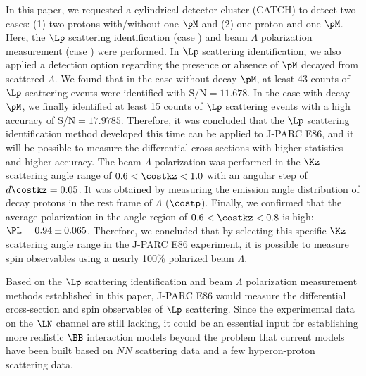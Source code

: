 In this paper, we requested a cylindrical detector cluster (CATCH) to detect two cases: (1) two protons with/without one $\pM$ and (2) one proton and one $\pM$. Here, the $\Lp$ scattering identification (case ) and beam $\Lambda$ polarization measurement (case ) were performed. 
In $\Lp$ scattering identification, we also applied a detection option regarding the presence or absence of $\pM$ decayed from scattered $\Lambda$. We found that in the case without decay $\pM$, at least 43 counts of $\Lp$ scattering events were identified with S/N$=11.678$. In the case with decay $\pM$, we finally identified at least 15 counts of $\Lp$ scattering events with a high accuracy of S/N$=17.9785$. Therefore, it was concluded that the $\Lp$ scattering identification method developed this time can be applied to J-PARC E86, and it will be possible to measure the differential cross-sections with higher statistics and higher accuracy.
The beam $\Lambda$ polarization was performed in the $\Kz$ scattering angle range of $0.6<\costkz<1.0$ with an angular step of $d\costkz=0.05$. It was obtained by measuring the emission angle distribution of decay protons in the rest frame of $\Lambda$ ($\costp$). Finally, we confirmed that the average polarization in the angle region of $0.6<\costkz<0.8$ is high: $\PL=0.94\pm0.065$. Therefore, we concluded that by selecting this specific $\Kz$ scattering angle range in the J-PARC E86 experiment, it is possible to measure spin observables using a nearly 100\% polarized beam $\Lambda$.

Based on the $\Lp$ scattering identification and beam $\Lambda$ polarization measurement methods established in this paper, J-PARC E86 would measure the differential cross-section and spin observables of $\Lp$ scattering. Since the experimental data on the $\LN$ channel are still lacking, it could be an essential input for establishing more realistic $\BB$ interaction models beyond the problem that current models have been built based on $NN$ scattering data and a few hyperon-proton scattering data. 

%
